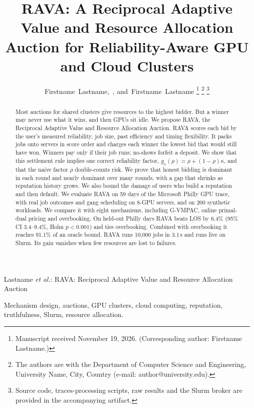 \documentclass[journal]{IEEEtran}
\theoremstyle{remark}
\begin{document}
\title{RAVA: A Reciprocal Adaptive Value and Resource Allocation Auction for Reliability-Aware GPU and Cloud Clusters}
\author{Firstname~Lastname,~,
        and~Firstname~Lastname%
\thanks{Manuscript received November 19, 2026. (Corresponding author: Firstname Lastname.)}%
\thanks{The authors are with the Department of Computer Science and Engineering, University Name, City, Country (e-mail: author@university.edu).}%
\thanks{Source code, traces-processing scripts, raw results and the Slurm broker are provided in the accompanying artifact.}}
%
{Lastname \MakeLowercase{\textit{et al.}}: RAVA: Reciprocal Adaptive Value and Resource Allocation Auction}
\maketitle

\begin{abstract}
Most auctions for shared clusters give resources to the highest bidder. But a winner may never use what it wins, and then GPUs sit idle. We propose RAVA, the Reciprocal Adaptive Value and Resource Allocation Auction. RAVA scores each bid by the user's measured reliability, job size, past efficiency and timing flexibility. It packs jobs onto servers in score order and charges each winner the lowest bid that would still have won. Winners pay only if their job runs; no-shows forfeit a deposit. We show that this settlement rule implies one correct reliability factor, $g_\kappa(\rho)=\rho+(1-\rho)\kappa$, and that the naive factor $\rho$ double-counts risk. We prove that honest bidding is dominant in each round and nearly dominant over many rounds, with a gap that shrinks as reputation history grows. We also bound the damage of users who build a reputation and then default. We evaluate RAVA on 59 days of the Microsoft Philly GPU trace, with real job outcomes and gang scheduling on 8-GPU servers, and on 200 synthetic workloads. We compare it with eight mechanisms, including G-VMPAC, online primal-dual pricing and overbooking. On held-out Philly days RAVA beats LOS by 6.4\% (95\% CI 3.4--9.4\%, Holm $p<0.001$) and ties overbooking. Combined with overbooking it reaches 91.1\% of an oracle bound. RAVA runs 10{,}000 jobs in 3.1\,s and runs live on Slurm. Its gain vanishes when few resources are lost to failures.
\end{abstract}

\begin{IEEEkeywords}
Mechanism design, auctions, GPU clusters, cloud computing, reputation, truthfulness, Slurm, resource allocation.
\end{IEEEkeywords}
\end{document}
